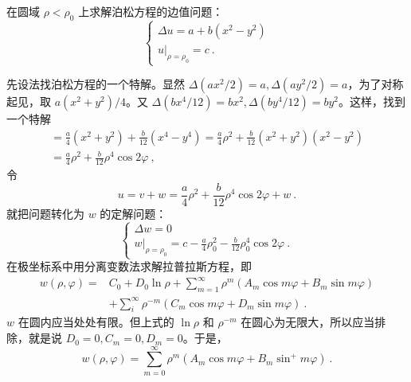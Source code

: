 \begin{example}{}
在圆域 $\rho<\rho_0$ 上求解泊松方程的边值问题：
\begin{equation}
\left\{\begin{array}{l}\Delta u=a+b\left(x^{2}-y^{2}\right) \\ \left.u\right|_{\rho=\rho_{0}}=c~.\end{array}\right.
\end{equation}

先设法找泊松方程的一个特解。显然 $\Delta (ax^2/2)=a, \Delta (ay^2/2)=a$，为了对称起见，取 $a(x^2+y^2)/4$。又 $\Delta (bx^4/12)=bx^2,\Delta (by^4/12)=by^2$。这样，找到一个特解
\begin{equation}
    \begin{array}{l}=\frac{a}{4}\left(x^{2}+y^{2}\right)+\frac{b}{12}\left(x^{4}-y^{4}\right)=\frac{a}{4} \rho^{2}+\frac{b}{12}\left(x^{2}+y^{2}\right)\left(x^{2}-y^{2}\right) \\ =\frac{a}{4} \rho^{2}+\frac{b}{12} \rho^{4} \cos 2 \varphi~,\end{array}
\end{equation}
令
\begin{equation}
    u=v+w=\frac{a}{4} \rho^{2}+\frac{b}{12} \rho^{4} \cos 2 \varphi+w~.
\end{equation}
就把问题转化为 $w$ 的定解问题：
\begin{equation}
    \left\{\begin{array}{l}\Delta w=0 \\ \left.w\right|_{\rho=\rho_{0}}=c-\frac{a}{4} \rho_{0}^{2}-\frac{b}{12} \rho_{0}^{4} \cos 2 \varphi~.\end{array}\right.
\end{equation}
在极坐标系中用分离变数法求解拉普拉斯方程，即
\begin{equation}
    \begin{aligned} w(\rho, \varphi)=& C_{0}+D_{0} \ln \rho+\sum_{m=1}^{\infty} \rho^{m}\left(A_{m} \cos m \varphi+B_{m} \sin m \varphi\right) \\ &+\sum_{i}^{\infty} \rho^{-m}\left(C_{m} \cos m \varphi+D_{m} \sin m \varphi\right) ~.\end{aligned}
\end{equation}
$w $ 在圆内应当处处有限。但上式的 $\ln \rho $ 和 $\rho^{-m}$ 在圆心为无限大，所以应当排除，就是说 $D_0=0,C_m=0,D_m=0$。于是，
\begin{equation}
    w(\rho, \varphi)=\sum_{m=0}^{\infty} \rho^{m}\left(A_{m} \cos m \varphi+B_{m} \sin ^{+} m \varphi\right)~.
\end{equation}

\end{example}
